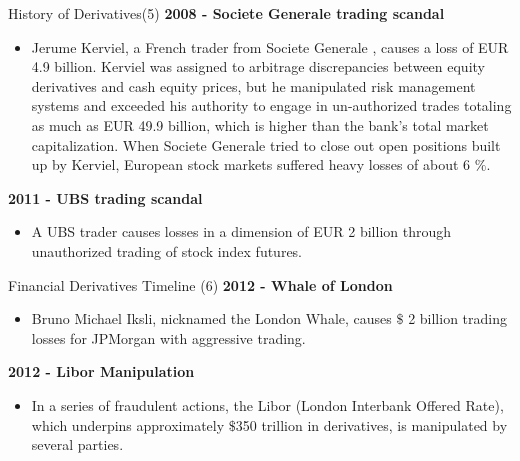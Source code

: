 {History of Derivatives(5)}
\textbf{2008 - Societe Generale trading scandal}
\begin{itemize}
  \item Jerume Kerviel, a French trader from Societe Generale , causes a loss of EUR 4.9 billion. Kerviel was assigned to arbitrage discrepancies between equity derivatives and cash equity prices, but he manipulated risk management systems and exceeded his authority to engage in un-authorized trades totaling as much as EUR 49.9 billion, which is higher than the bank's total market capitalization. When Societe Generale  tried to close out open positions built up by Kerviel, European stock markets suffered heavy losses of about 6 $\%$.
\end{itemize}
\textbf{2011 - UBS trading scandal}
\begin{itemize}
  \item A UBS trader causes losses in a dimension of EUR 2 billion through unauthorized trading of stock index futures.
\end{itemize}


{Financial Derivatives Timeline (6)}
\textbf{2012 - Whale of London}
\begin{itemize}
  \item Bruno Michael Iksli, nicknamed the London Whale, causes $\$$ 2 billion trading losses for JPMorgan with aggressive trading.
\end{itemize}
\textbf{2012 - Libor Manipulation}
\begin{itemize}
\item In a series of fraudulent actions, the Libor (London Interbank Offered Rate), which underpins approximately $\$$350 trillion in derivatives, is manipulated by several parties.
\end{itemize}


